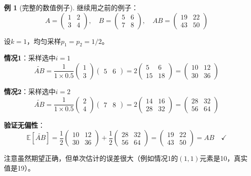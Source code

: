 \documentclass[11pt,a4paper]{ctexart}
\theoremstyle{definition}
\newtheorem{example}[theorem]{例}
\theoremstyle{remark}
\begin{document}
\begin{example}[完整的数值例子]
继续用之前的例子：
\[
A = \begin{pmatrix} 1 & 2 \\ 3 & 4 \end{pmatrix}, \quad B = \begin{pmatrix} 5 & 6 \\ 7 & 8 \end{pmatrix}, \quad AB = \begin{pmatrix} 19 & 22 \\ 43 & 50 \end{pmatrix}
\]

设$k=1$，均匀采样$p_1 = p_2 = 1/2$。

\textbf{情况1}：采样选中$i=1$
\[
\widetilde{AB} = \frac{1}{1 \times 0.5} \begin{pmatrix} 1 \\ 3 \end{pmatrix} \begin{pmatrix} 5 & 6 \end{pmatrix} = 2 \begin{pmatrix} 5 & 6 \\ 15 & 18 \end{pmatrix} = \begin{pmatrix} 10 & 12 \\ 30 & 36 \end{pmatrix}
\]

\textbf{情况2}：采样选中$i=2$
\[
\widetilde{AB} = \frac{1}{1 \times 0.5} \begin{pmatrix} 2 \\ 4 \end{pmatrix} \begin{pmatrix} 7 & 8 \end{pmatrix} = 2 \begin{pmatrix} 14 & 16 \\ 28 & 32 \end{pmatrix} = \begin{pmatrix} 28 & 32 \\ 56 & 64 \end{pmatrix}
\]

\textbf{验证无偏性}：
\[
\mathbb{E}[\widetilde{AB}] = \frac{1}{2} \begin{pmatrix} 10 & 12 \\ 30 & 36 \end{pmatrix} + \frac{1}{2} \begin{pmatrix} 28 & 32 \\ 56 & 64 \end{pmatrix} = \begin{pmatrix} 19 & 22 \\ 43 & 50 \end{pmatrix} = AB \quad \checkmark
\]

注意虽然期望正确，但单次估计的误差很大（例如情况1的$(1,1)$元素是10，真实值是19）。
\end{example}
\end{document}
